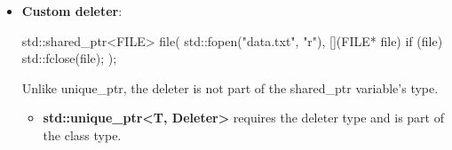 \documentclass{report}
\begin{document}
\begin{itemize}
\begin{itemize}
\begin{cppcode}
                        auto checked =
                        std::dynamic_pointer_cast<Derived>(base);

                        auto constant =
                        std::const_pointer_cast<const MyType>(p); 
                    \end{cppcode}
                    \bigbreak \noindent 
                    These preserve the shared control block. 
                    \bigbreak \noindent 
                    C++ provides four primary pointer cast functions for std::shared\_ptr via <memory>
                    \begin{itemize}
                        \item \textbf{std::static\_pointer\_cast:} Casts a pointer up or down an inheritance hierarchy at compile time using static\_cast. It performs no runtime checks, so you must ensure the conversion is valid
                        \item \textbf{std::dynamic\_pointer\_cast:} Safely downcasts a polymorphic base class pointer to a derived class pointer at runtime using dynamic\_cast. It returns an empty std::shared\_ptr if the object is not of the target type. 
                        \item \textbf{std::const\_pointer\_cast:} Adds or removes const qualifiers from the managed object type using const\_cast
                        \item \textbf{std::reinterpret\_pointer\_cast:} Reinterprets the underlying pointer type to an unrelated type using reinterpret\_cast. This is low-level and rarely needed
                    \end{itemize}
                \item \textbf{Custom deleter}:
                    \bigbreak \noindent 
                    \begin{cppcode}
                        std::shared_ptr<FILE> file(
                            std::fopen("data.txt", "r"),
                            [](FILE* file) {
                                if (file)
                                std::fclose(file);
                            }
                        );
                    \end{cppcode}
                    \bigbreak \noindent 
                    Unlike unique\_ptr, the deleter is not part of the shared\_ptr variable’s type.
                    \begin{itemize}
                        \item \textbf{std::unique\_ptr<T, Deleter>} requires the deleter type and is part of the class type.

\end{itemize}
\end{itemize}
\end{itemize}
\end{document}
